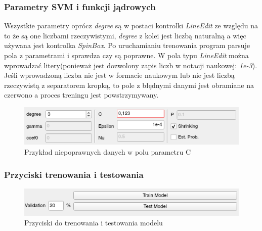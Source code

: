 \documentclass[paper=a4, fontsize=11pt]{scrartcl} %
\numberwithin{equation}{section} %
\numberwithin{figure}{section} %
\begin{document}
\subsubsection{Parametry SVM i funkcji jądrowych}

    \par Wszystkie parametry oprócz \textit{degree} są w postaci kontrolki \textit{LineEdit} ze
    względu na to że są one liczbami rzeczywistymi, \textit{degree} z kolei jest liczbą
    naturalną a więc używana jest kontrolka \textit{SpinBox}. Po uruchamianiu trenowania
    program parsuje pola z parametrami i sprawdza czy są poprawne. W pola typu
    \textit{LineEdit} można wprowadzać litery(ponieważ jest dozwolony zapis liczb w notacji
    naukowej: \textit{1e-3}). Jeśli wprowadzoną liczba nie jest w formacie naukowym lub nie
    jest liczbą rzeczywistą z separatorem kropką, to pole z błędnymi danymi jest obramiane na
    czerwono a proces treningu jest powstrzymywany.

    \begin{figure}[h]
        \begin{center}
            \includegraphics[scale=1.0]{./img/svm_app_param_wrong.png}
            \caption{Przykład niepoprawnych danych w polu parametru C}
            \label{fig:param_wrong}
        \end{center}
    \end{figure}

\subsubsection{Przyciski trenowania i testowania}

    \begin{figure}[h]
        \begin{center}
            \includegraphics[scale=1.0]{./img/train_test_buttons.png}
            \caption{Przyciski do trenowania i testowania modelu}
            \label{fig:train_test_buttons}
        \end{center}
    \end{figure}
\end{document}
